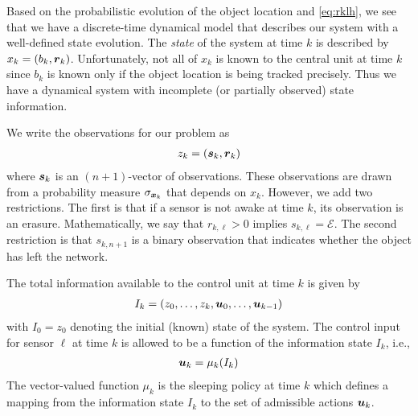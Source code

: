 \documentclass[journal,draftcls,onecolumn,11pt]{IEEEtran}
\newcommand{\emb}[1]{\text{\boldmath{$#1$}}}
\begin{document}
Based on the probabilistic evolution of the object location and \eqref{eq:rklh}, we see that we have a discrete-time dynamical model that describes our system with a well-defined state evolution.  The {\em state} of the system at time $k$ is described by $x_k = (b_k, \emb{r}_k)$. Unfortunately, not all of $x_k$ is known to the central unit at time $k$ since $b_k$ is known only if the object location is being tracked precisely.  Thus we have a dynamical system with incomplete (or partially observed) state information.

We write the observations for our problem as
\begin{align} \label{eq:zkh}
   z_k = (\emb{s}_k,\emb{r}_k)
\end{align}
where $\emb{s}_k$ is an $(n+1)$-vector of observations.  These observations are drawn from a probability measure $\sigma_{\emb{x}_k}$ that depends on $x_k$.
However, we add two restrictions.  The first is that if a sensor is not awake at time $k$, its observation is an erasure.  Mathematically, we say that $r_{k,\ell} > 0$ implies $s_{k,\ell} = \mathcal{E}$.  The second restriction is that $s_{k,n+1}$ is a binary observation that indicates whether the object has left the network.

The total information available to the control unit at time $k$ is given by
\begin{align} \label{eq:Ikh}
   I_k = (z_0, \ldots, z_k, \emb{u}_0, \ldots, \emb{u}_{k-1})
\end{align}
with $I_0 = z_0$ denoting the initial (known) state of the system.
The control input for sensor $\ell$ at time $k$ is allowed to be a function of the information state $I_k$, i.e.,
\begin{align} \label{eq:mukh}
   \emb{u}_k = \mu_k(I_k)
\end{align}
The vector-valued function $\mu_k$ is the sleeping policy at time $k$ which defines a mapping from the information state $I_k$ to the set of admissible actions $\emb{u}_k$.
\end{document}
